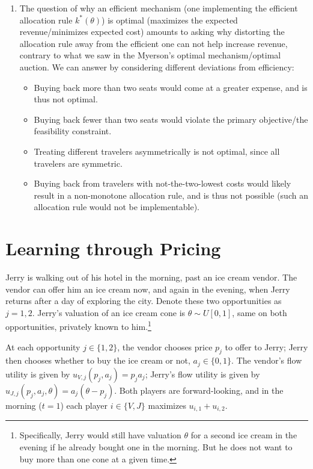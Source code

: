 \documentclass[a4paper]{article}
\begin{document}
\begin{enumerate}
	\item The question of why an efficient mechanism (one implementing the efficient allocation rule $k^*(\theta)$) is optimal (maximizes the expected revenue/minimizes expected cost) amounts to asking why distorting the allocation rule away from the efficient one can not help increase revenue, contrary to what we saw in the Myerson's optimal mechanism/optimal auction. We can answer by considering different deviations from efficiency:
	\begin{itemize}
		\item Buying back more than two seats would come at a greater expense, and is thus not optimal.
		\item Buying back fewer than two seats would violate the primary objective/the feasibility constraint. 
		\item Treating different travelers asymmetrically is not optimal, since all travelers are symmetric.
		\item Buying back from travelers with not-the-two-lowest costs would likely result in a non-monotone allocation rule, and is thus not possible (such an allocation rule would not be implementable).
	\end{itemize}
\end{enumerate}

\fi 




\section{Learning through Pricing}

Jerry is walking out of his hotel in the morning, past an ice cream vendor. The vendor can offer him an ice cream now, and again in the evening, when Jerry returns after a day of exploring the city. Denote these two opportunities as $j = 1,2$. Jerry's valuation of an ice cream cone is $\theta \sim U[0,1]$, same on both opportunities, privately known to him.\footnote{Specifically, Jerry would still have valuation $\theta$ for a second ice cream in the evening if he already bought one in the morning. But he does not want to buy more than one cone at a given time.}

At each opportunity $j \in \{1,2\}$, the vendor chooses price $p_j$ to offer to Jerry; Jerry then chooses whether to buy the ice cream or not, $a_j \in \{0,1\}$. The vendor's flow utility is given by $u_{V,j} (p_j,a_j) = p_j a_j$; Jerry's flow utility is given by $u_{J,j} (p_j,a_j,\theta) = a_j(\theta - p_j)$. Both players are forward-looking, and in the morning ($t=1$) each player $i \in \{V,J\}$ maximizes $u_{i,1} + u_{i,2}$. 
\end{document}
